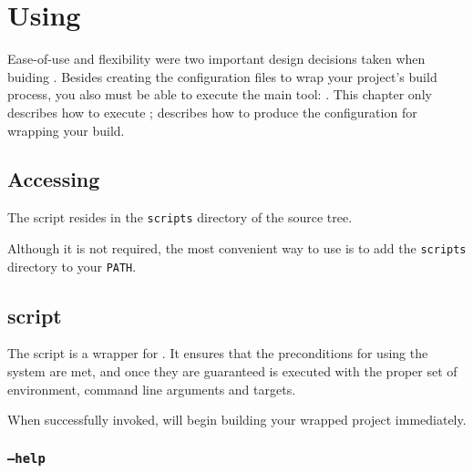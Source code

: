 %
%
%
%
\chapter{Using \lmsbw}

Ease-of-use and flexibility were two important design decisions taken
when buiding \lmsbw.  Besides creating the configuration files to wrap
your project's build process, you also must be able to execute the
main tool: \lmsbw.  This chapter only describes how to execute \lmsbw;
 describes how to produce the configuration for
wrapping your build.

\section{Accessing \lmsbw}

The \lmsbw script resides in the \texttt{scripts} directory of the
\lmsbw source tree.

Although it is not required, the most convenient way to use \lmsbw is
to add the \texttt{scripts} directory to your \texttt{PATH}.

\section{\lmsbw script}

The \lmsbw script is a wrapper for \make.  It ensures that the
preconditions for using the \lmsbw system are met, and once they are
guaranteed \make is executed with the proper set of environment,
command line arguments and targets.

When successfully invoked, \lmsbw will begin building your wrapped
project immediately.

\subsection{\texttt{--help}}

